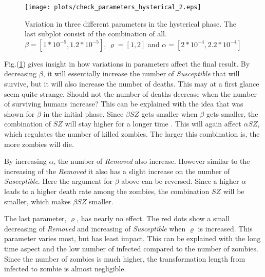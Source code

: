\documentclass[%
twoside,                 %
final,                   %
10pt]{article}
\begin{document}
\begin{figure}[ht]
  \centerline{\texttt{[image: plots/check\_parameters\_hysterical\_2.eps]}}
  \caption{
  \label{fig:hysterical_variations} Variation in three different parameters in the hysterical phase. The last subplot consist of the combination of all. $\beta=[1*10^{-5},1.2*10^{-5}]$, $\varrho=[1,2]$ and $\alpha=[2*10^{-4},2.2*10^{-4}]$
  }
\end{figure}


Fig.(\ref{fig:hysterical_variations}) gives insight in how variations in parameters affect the final result. By decreasing $\beta$, it will essentially increase the number of \emph{Susceptible} that will survive, but it will also increase the number of deaths. This may at a first glance seem quite strange. Should not the number of deaths decrease when the number of surviving humans increase? This can be explained with the idea that was shown for $\beta$ in the initial phase. Since $\beta SZ$ gets smaller when $\beta$ gets smaller, the combination of $SZ$ will stay higher for a longer time . This will again affect $\alpha SZ$, which regulates the number of killed zombies. The larger this combination is, the more zombies will die. 


\vspace{3mm}




\vspace{3mm}


By increasing $\alpha$, the number of \emph{Removed} also increase. However similar to the increasing of the \emph{Removed} it also has a slight increase on the number of \emph{Susceptible}. Here the argument for $\beta$ above can be reversed. Since a higher $\alpha$ leads to a higher death rate among the zombies, the combination $SZ$ will be smaller, which makes $\beta SZ$ smaller.


\vspace{3mm}




\vspace{3mm}


The last parameter, $\varrho$, has nearly no effect. The red dots show a small decreasing of \emph{Removed} and increasing of \emph{Susceptible}  when $\varrho$ is increased. This parameter varies most, but has least impact. This can be explained with the long time aspect and the low number of infected compared to the number of zombies. Since the number of zombies is much higher, the transformation length from infected to zombie is almost negligible.  
\end{document}
